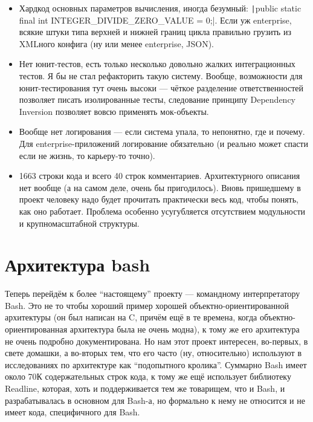 \documentclass[a5paper]{article}
\begin{document}
\begin{itemize}
	\item Хардкод основных параметров вычисления, иногда безумный: \texttt|public static final int INTEGER_DIVIDE_ZERO_VALUE = 0;|. Если уж enterprise, всякие штуки типа верхней и нижней границ цикла правильно грузить из XMLного конфига (ну или менее enterprise, JSON).
	\item Нет юнит-тестов, есть только несколько довольно жалких интеграционных тестов. Я бы не стал рефакторить такую систему. Вообще, возможности для юнит-тестирования тут очень высоки --- чёткое разделение ответственностей позволяет писать изолированные тесты, следование принципу Dependency Inversion позволяет вовсю применять мок-объекты.
	\item Вообще нет логирования --- если система упала, то непонятно, где и почему. Для enterprise-приложений логирование обязательно (и реально может спасти если не жизнь, то карьеру-то точно).
	\item 1663 строки кода и всего 40 строк комментариев. Архитектурного описания нет вообще (а на самом деле, очень бы пригодилось). Вновь пришедшему в проект человеку надо будет прочитать практически весь код, чтобы понять, как оно работает. Проблема особенно усугубляется отсутствием модульности и крупномасштабной структуры.
\end{itemize}

\section{Архитектура bash}

Теперь перейдём к более ``настоящему'' проекту --- командному интерпретатору Bash. Это не то чтобы хороший пример хорошей объектно-ориентированной архитектуры (он был написан на C, причём ещё в те времена, когда объектно-ориентированная архитектура была не очень модна), к тому же его архитектура не очень подробно документирована. Но нам этот проект интересен, во-первых, в свете домашки, а во-вторых тем, что его часто (ну, относительно) используют в исследованиях по архитектуре как ``подопытного кролика''. Суммарно Bash имеет около 70К содержательных строк кода, к тому же ещё использует библиотеку Readline, которая, хоть и поддерживается тем же товарищем, что и Bash, и разрабатывалась в основном для Bash-а, но формально к нему не относится и не имеет кода, специфичного для Bash.
\end{document}
